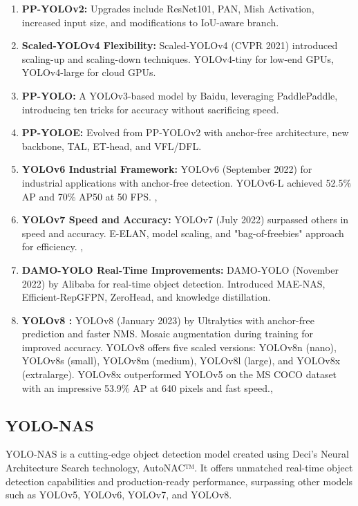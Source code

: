 \begin{enumerate}
    \item \textbf{PP-YOLOv2: }  Upgrades include ResNet101, PAN, Mish Activation, increased input size, and modifications to IoU-aware branch. \cite{huang2021pp}\\
    \item \textbf{Scaled-YOLOv4 Flexibility: } Scaled-YOLOv4 (CVPR 2021) introduced scaling-up and scaling-down techniques. YOLOv4-tiny for low-end GPUs, YOLOv4-large for cloud GPUs. \cite{wang2021scaled}\\ 
    \item \textbf{PP-YOLO: } A YOLOv3-based model by Baidu, leveraging PaddlePaddle, introducing ten tricks for accuracy without sacrificing speed.\cite{long2020pp}\\
    \item \textbf{PP-YOLOE: } Evolved from PP-YOLOv2 with anchor-free architecture, new backbone, TAL, ET-head, and VFL/DFL. \cite{xu2022pp}\\
    \item \textbf{YOLOv6 Industrial Framework: } 
    YOLOv6 (September 2022) for industrial applications with anchor-free detection.
    YOLOv6-L achieved 52.5\% AP and 70\% AP50 at 50 FPS. \cite{li2022yolov6}, \cite{terven2023comprehensive}
    \item \textbf{YOLOv7 Speed and Accuracy: } YOLOv7 (July 2022) surpassed others in speed and accuracy.
    E-ELAN, model scaling, and "bag-of-freebies" approach for efficiency. \cite{wang2023yolov7}, \cite{terven2023comprehensive}\\
    \item \textbf{DAMO-YOLO Real-Time Improvements: } DAMO-YOLO (November 2022) by Alibaba for real-time object detection. 
    Introduced MAE-NAS, Efficient-RepGFPN, ZeroHead, and knowledge distillation. \cite{xu2022damo}\\
    \item \textbf{YOLOv8 :}
    YOLOv8 (January 2023) by Ultralytics with anchor-free prediction and faster NMS. Mosaic augmentation during training for improved accuracy.
    YOLOv8 offers five scaled versions: YOLOv8n (nano), YOLOv8s (small), YOLOv8m (medium), YOLOv8l (large), and YOLOv8x (extra\-large). YOLOv8x outperformed YOLOv5 on the MS COCO dataset with an impressive 53.9\% AP at 640 pixels and fast speed.\cite{yolov8}, \cite{terven2023comprehensive}
\end{enumerate}

\subsection{YOLO-NAS}
YOLO-NAS is a cutting-edge object detection model created using Deci's Neural Architecture Search technology, AutoNAC™. It offers unmatched real-time object detection capabilities and production-ready performance, surpassing other models such as YOLOv5, YOLOv6, YOLOv7, and YOLOv8.


